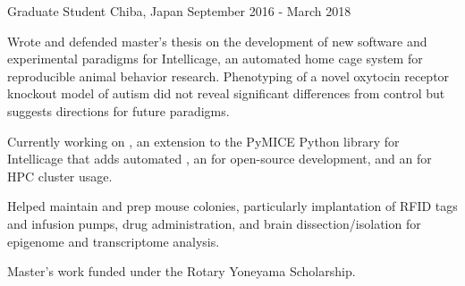 \begin{cventries}
    {Graduate Student}
    {Chiba, Japan}
    {September 2016 - March 2018}
    {\begin{cvitems}
        \item{
            {Wrote} and 
            {defended} master's thesis on the development of new software and
            experimental paradigms for Intellicage, an automated home cage system for
            reproducible animal behavior research. Phenotyping of a novel oxytocin
            receptor knockout model of autism did not reveal significant differences
            from control but suggests directions for future paradigms.\vspace*{0.1cm}}
        \item{Currently working on , an extension to the
            PyMICE Python library for Intellicage that adds automated , an
             for
            open-source development, and an  for HPC cluster
            usage.\vspace*{0.1cm}}
        \item{Helped maintain and prep mouse colonies, particularly implantation of RFID
            tags and infusion pumps, drug administration, and brain dissection/isolation
            for epigenome and transcriptome analysis.\vspace*{0.1cm}}
        \item{Master's work funded under the Rotary Yoneyama 
            {Scholarship}.}
    \end{cvitems}}
    \vspace*{0.2cm}
    

\end{cventries}

